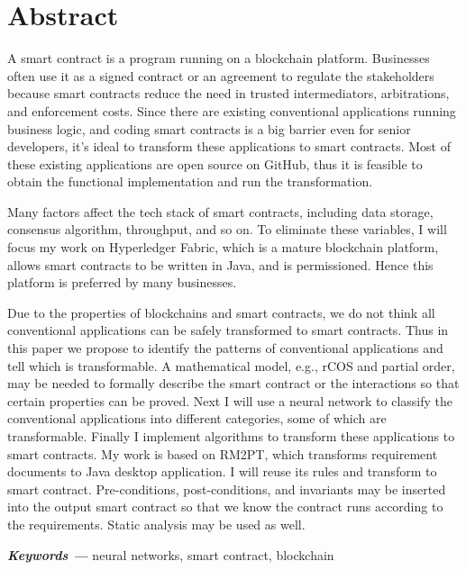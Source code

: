 \chapter{Abstract}

A smart contract is a program running on a blockchain platform.
Businesses often use it as a signed contract or an agreement to regulate the stakeholders
because smart contracts reduce the need in trusted intermediators, arbitrations, and enforcement costs.
Since there are existing conventional applications running business logic, 
and coding smart contracts is a big barrier even for senior developers,
it’s ideal to transform these applications to smart contracts. 
Most of these existing applications are open source on GitHub, thus it is feasible to obtain the functional implementation and run the transformation.

Many factors affect the tech stack of smart contracts, including data storage, consensus algorithm, throughput, and so on.
To eliminate these variables, I will focus my work on Hyperledger Fabric, 
which is a mature blockchain platform, allows smart contracts to be written in Java, and is permissioned. 
Hence this platform is preferred by many businesses.

Due to the properties of blockchains and smart contracts, we do not think all conventional applications can be safely transformed to smart contracts.
Thus in this paper we propose to identify the patterns of conventional applications and tell which is transformable.
A mathematical model, e.g., rCOS and partial order, may be needed to formally describe the smart contract or the interactions so that certain properties can be proved.
Next I will use a neural network to classify the conventional applications into different categories, some of which are transformable.
Finally I implement algorithms to transform these applications to smart contracts.
My work is based on RM2PT, which transforms requirement documents to Java desktop application. I will reuse its rules and transform to smart contract.
Pre-conditions, post-conditions, and invariants may be inserted into the output smart contract so that we know the contract runs according to the requirements.
Static analysis may be used as well.



\textbf{\textit{Keywords ---}} neural networks, smart contract, blockchain